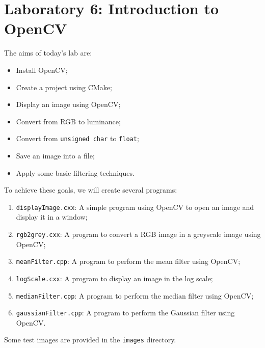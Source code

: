 \documentclass[english,a4paper,12pt,oneside]{article}
\begin{document}
\section*{Laboratory 6: Introduction to OpenCV}


The aims of today's lab are:
\begin{itemize}
	\item Install OpenCV;
	\item Create a project using CMake;
	\item Display an image using OpenCV;
	\item Convert from RGB to luminance;
	\item Convert from \verb|unsigned char| to \verb|float|;
	\item Save an image into a file;
	\item Apply some basic filtering techniques.
\end{itemize}

To achieve these goals, we will create several programs:
\begin{enumerate}
	\item \verb+displayImage.cxx+:   A simple program using OpenCV to open an image and display it in a window;
	\item \verb+rgb2grey.cxx+:       A program to convert a RGB image in a greyscale image using OpenCV;
	\item \verb+meanFilter.cpp+:     A program to perform the mean filter using OpenCV;
	\item \verb+logScale.cxx+:       A program to display an image in the log scale;
	\item \verb+medianFilter.cpp+:   A program to perform the median filter using OpenCV;
	\item \verb+gaussianFilter.cpp+: A program to perform the Gaussian filter using OpenCV.
\end{enumerate}

Some test images are provided in the \verb+images+ directory.


\newpage
\end{document}
